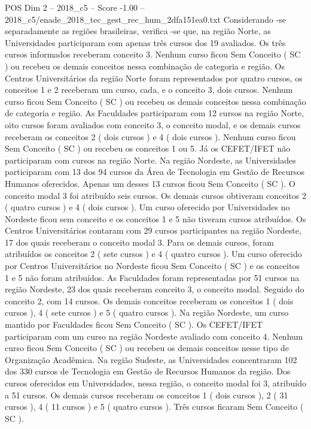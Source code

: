 \begin{textsample}{POS Dim 2 – 2018\_c5 – Score -1.00 – 2018\_c5/enade\_2018\_tec\_gest\_rec\_hum\_2dfa151ea0.txt}
Considerando -se separadamente as regiões brasileiras, verifica -se que, na região Norte, as Universidades participaram com apenas três cursos dos 19 avaliados.
Os três cursos informados receberam conceito 3.
Nenhum curso ficou Sem Conceito ( SC ) ou recebeu os demais conceitos nessa combinação de categoria e região.
Os Centros Universitários da região Norte foram representados por quatro cursos, os conceitos 1 e 2 receberam um curso, cada, e o conceito 3, dois cursos.
Nenhum curso ficou Sem Conceito ( SC ) ou recebeu os demais conceitos nessa combinação de categoria e região.
As Faculdades participaram com 12 cursos na região Norte, oito cursos foram avaliados com conceito 3, o conceito modal, e os demais cursos receberam os conceitos 2 ( dois cursos ) e 4 ( dois cursos ).
Nenhum curso ficou Sem Conceito ( SC ) ou recebeu os conceitos 1 ou 5.
Já os CEFET/IFET não participaram com cursos na região Norte.
Na região Nordeste, as Universidades participaram com 13 dos 94 cursos da Área de Tecnologia em Gestão de Recursos Humanos oferecidos.
Apenas um desses 13 cursos ficou Sem Conceito ( SC ).
O conceito modal 3 foi atribuído seis cursos.
Os demais cursos obtiveram conceitos 2 ( quatro cursos ) e 4 ( dois cursos ).
Um curso oferecido por Universidades no Nordeste ficou sem conceito e os conceitos 1 e 5 não tiveram cursos atribuídos.
Os Centros Universitários contaram com 29 cursos participantes na região Nordeste, 17 dos quais receberam o conceito modal 3.
Para os demais cursos, foram atribuídos os conceitos 2 ( sete cursos ) e 4 ( quatro cursos ).
Um curso oferecido por Centros Universitários no Nordeste ficou Sem Conceito ( SC ) e os conceitos 1 e 5 não foram atribuídos.
As Faculdades foram representadas por 51 cursos na região Nordeste, 23 dos quais receberam conceito 3, o conceito modal.
Seguido do conceito 2, com 14 cursos.
Os demais conceitos receberam os conceitos 1 ( dois cursos ), 4 ( sete cursos ) e 5 ( quatro cursos ).
Na região Nordeste, um curso mantido por Faculdades ficou Sem Conceito ( SC ).
Os CEFET/IFET participaram com um curso na região Nordeste avaliado com conceito 4.
Nenhum curso ficou Sem Conceito ( SC ) ou recebeu os demais conceitos nesse tipo de Organização Acadêmica.
Na região Sudeste, as Universidades concentraram 102 dos 330 cursos de Tecnologia em Gestão de Recursos Humanos da região.
Dos cursos oferecidos em Universidades, nessa região, o conceito modal foi 3, atribuído a 51 cursos.
Os demais cursos receberam os conceitos 1 ( dois cursos ), 2 ( 31 cursos ), 4 ( 11 cursos ) e 5 ( quatro cursos ).
Três cursos ficaram Sem Conceito ( SC ).

\end{textsample}
